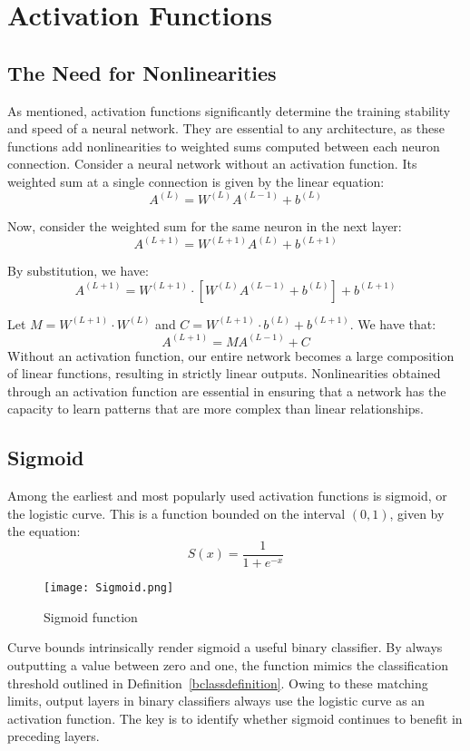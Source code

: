 \documentclass{article}
\theoremstyle{definition}
\begin{document}
\section{Activation Functions}
\label{sec:activation}
\subsection{The Need for Nonlinearities}
As mentioned, activation functions significantly determine the training stability and speed of a neural network. They are essential to any architecture, as these functions add nonlinearities to weighted sums computed between each neuron connection. 
Consider a neural network without an activation function. Its weighted sum at a single connection is given by the linear equation:
\[
A^{(L)} = W^{(L)}A^{(L-1)} + b^{(L)}
\]

Now, consider the weighted sum for the same neuron in the next layer:
\[
A^{(L+1)} = W^{(L+1)}A^{(L)} + b^{(L+1)}
\]

By substitution, we have:
\[
A^{(L+1)} = W^{(L+1)} \cdot [W^{(L)}A^{(L-1)} + b^{(L)}] + b^{(L+1)}
\]

Let $M = W^{(L+1)}\cdot W^{(L)}$ and $C = W^{(L+1)} \cdot b^{(L)} + b^{(L+1)}$. We have that:
\[
A^{(L+1)} = MA^{(L-1)} + C
\]
Without an activation function, our entire network becomes a large composition of linear functions, resulting in strictly linear outputs. Nonlinearities obtained through an activation function are essential in ensuring that a network has the capacity to learn patterns that are more complex than linear relationships. 
\subsection{Sigmoid}
Among the earliest and most popularly used activation functions is sigmoid, or the logistic curve. This is a function bounded on the interval $(0, 1)$, given by the equation:
\begin{equation}
\label{sigmoid}
S(x) = \frac{1}{1+e^{-x}}
\end{equation}
\begin{figure}[H]
    \centering
    \texttt{[image: Sigmoid.png]}
    \caption{Sigmoid function}
    \label{fig:Figure 3}
\end{figure}
Curve bounds intrinsically render sigmoid a useful binary classifier. By always outputting a value between zero and one, the function mimics the classification threshold outlined in Definition~\ref{bclassdefinition}. Owing to these matching limits, output layers in binary classifiers always use the logistic curve as an activation function. The key is to identify whether sigmoid continues to benefit in preceding layers.
\end{document}
